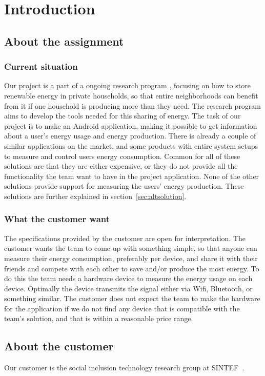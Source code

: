 \chapter{Introduction}

\section{About the assignment}
\subsection{Current situation}
Our project is a part of a ongoing research program \cite{cossmic}, focusing on how to store renewable energy in private households, so that entire neighborhoods can benefit from it if one household is producing more than they need. The research program aims to develop the tools needed for this sharing of energy. The task of our project is to make an Android application, making it possible to get information about a user's energy usage and energy production. There is already a couple of similar applications on the market, and some products with entire system setups to measure and control users energy consumption. Common for all of these solutions are that they are either expensive, or they do not provide all the functionality the team want to have in the project application. None of the other solutions provide support for measuring the users' energy production. These solutions are further explained in section~\ref{sec:altsolution}.

\subsection{What the customer want}
The specifications provided by the customer are open for interpretation. The customer wants the team to come up with something simple, so that anyone can measure their energy consumption, preferably per device, and share it with their friends and compete with each other to save and/or produce the most energy. To do this the team needs a hardware device to measure the energy usage on each device. Optimally the device transmits the signal either via Wifi, Bluetooth, or something similar. The customer does not expect the team to make the hardware for the application if we do not find any device that is compatible with the team's solution, and that is within a reasonable price range.

\section{About the customer}

Our customer is the social inclusion technology research group at SINTEF~\cite{sintef}.








 


